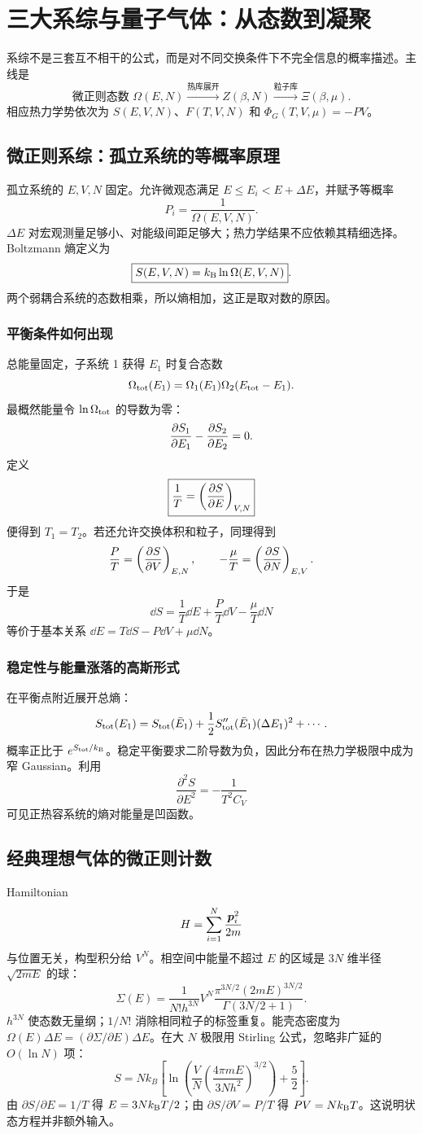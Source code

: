 \chapter{三大系综与量子气体：从态数到凝聚}

\begin{mapbox}
系综不是三套互不相干的公式，而是对不同交换条件下不完全信息的概率描述。主线是
\[
\text{微正则态数 }\Omega(E,N)
\xrightarrow{\text{热库展开}}
Z(\beta,N)
\xrightarrow{\text{粒子库}}
\Xi(\beta,\mu).
\]
相应热力学势依次为 $S(E,V,N)$、$F(T,V,N)$ 和
$\Phi_G(T,V,\mu)=-PV$。
\end{mapbox}

\section{微正则系综：孤立系统的等概率原理}
孤立系统的 $E,V,N$ 固定。允许微观态满足
$E\le E_i<E+\Delta E$，并赋予等概率
\[
P_i=\frac1{\Omega(E,V,N)}.
\]
$\Delta E$ 对宏观测量足够小、对能级间距足够大；热力学结果不应依赖其精细选择。Boltzmann 熵定义为
\[
\boxed{S(E,V,N)=k_{\mathrm B}\ln\Omega(E,V,N)}.
\]
两个弱耦合系统的态数相乘，所以熵相加，这正是取对数的原因。

\subsection{平衡条件如何出现}
总能量固定，子系统 1 获得 $E_1$ 时复合态数
\[
\Omega_{\rm tot}(E_1)
=\Omega_1(E_1)\Omega_2(E_{\rm tot}-E_1).
\]
最概然能量令 $\ln\Omega_{\rm tot}$ 的导数为零：
\[
\frac{\partial S_1}{\partial E_1}
-\frac{\partial S_2}{\partial E_2}=0.
\]
定义
\[
\boxed{\frac1T=\left(\frac{\partial S}{\partial E}\right)_{V,N}}
\]
便得到 $T_1=T_2$。若还允许交换体积和粒子，同理得到
\[
\frac PT=\left(\frac{\partial S}{\partial V}\right)_{E,N},\qquad
-\frac\mu T=\left(\frac{\partial S}{\partial N}\right)_{E,V}.
\]
于是
\[
\dd S=\frac1T\dd E+\frac PT\dd V-\frac\mu T\dd N
\]
等价于基本关系 $\dd E=T\dd S-P\dd V+\mu\dd N$。

\subsection{稳定性与能量涨落的高斯形式}
在平衡点附近展开总熵：
\[
S_{\rm tot}(E_1)
=S_{\rm tot}(\bar E_1)
+\frac12S_{\rm tot}''(\bar E_1)(\Delta E_1)^2+\cdots.
\]
概率正比于 $e^{S_{\rm tot}/k_{\mathrm B}}$。稳定平衡要求二阶导数为负，因此分布在热力学极限中成为窄 Gaussian。利用
\[
\frac{\partial^2S}{\partial E^2}=-\frac1{T^2C_V}
\]
可见正热容系统的熵对能量是凹函数。

\section{经典理想气体的微正则计数}
Hamiltonian
\[
H=\sum_{i=1}^N\frac{\bm{p}_i^2}{2m}
\]
与位置无关，构型积分给 $V^N$。相空间中能量不超过 $E$ 的区域是
$3N$ 维半径 $\sqrt{2mE}$ 的球：
\[
\Sigma(E)=\frac1{N!h^{3N}}V^N
\frac{\pi^{3N/2}(2mE)^{3N/2}}
{\Gamma(3N/2+1)}.
\]
$h^{3N}$ 使态数无量纲；$1/N!$ 消除相同粒子的标签重复。能壳态密度为
$\Omega(E)\Delta E=(\partial\Sigma/\partial E)\Delta E$。在大 $N$ 极限用 Stirling 公式，忽略非广延的 $O(\ln N)$ 项：
\[
\boxed{
S=Nk_B\left[
\ln\left(\frac VN
\left(\frac{4\pi mE}{3Nh^2}\right)^{3/2}\right)
+\frac52\right]}.
\]
由 $\partial S/\partial E=1/T$ 得
$E=3Nk_{\mathrm B} T/2$；由 $\partial S/\partial V=P/T$ 得
$PV=Nk_{\mathrm B} T$。这说明状态方程并非额外输入。

